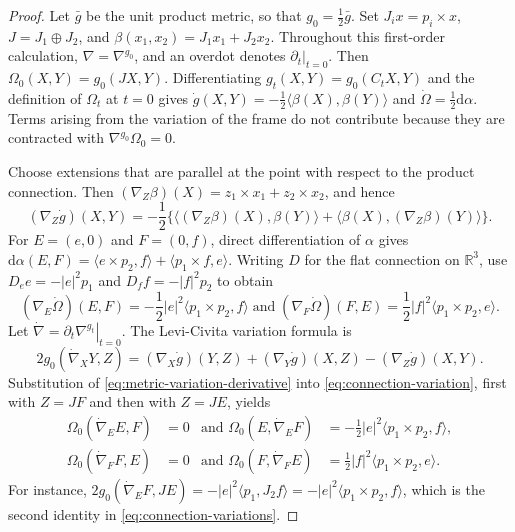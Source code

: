 \documentclass[11pt]{article}
\theoremstyle{definition}
\theoremstyle{remark}
\newcommand{\R}{\mathbb R}
\newcommand{\dd}{\mathrm d}
\begin{document}
\begin{proof}
Let $\bar g$ be the unit product metric, so that
$g_0=\frac12\bar g$.  Set $J_i x=p_i\times x$,
$J=J_1\oplus J_2$, and $\beta(x_1,x_2)=J_1x_1+J_2x_2$.
Throughout this first-order calculation, $\nabla=\nabla^{g_0}$, and an
overdot denotes $\left.\partial_t\right|_{t=0}$.
Then $\Omega_0(X,Y)=g_0(JX,Y)$.  Differentiating
$g_t(X,Y)=g_0(C_tX,Y)$ and the definition of $\Omega_t$ at $t=0$ gives
$\dot g(X,Y)=-\tfrac12\langle\beta(X),\beta(Y)\rangle$ and
$\dot\Omega=\tfrac12\dd\alpha$.
Terms arising from the variation of the frame do not contribute because they
are contracted with $\nabla^{g_0}\Omega_0=0$.

Choose extensions that are parallel at the point with respect to the product
connection.  Then
$(\nabla_Z\beta)(X)=z_1\times x_1+z_2\times x_2$, and hence
\begin{equation}\label{eq:metric-variation-derivative}
 (\nabla_Z\dot g)(X,Y)=-\frac12\{\langle(\nabla_Z\beta)(X),\beta(Y)\rangle+\langle\beta(X),(\nabla_Z\beta)(Y)\rangle\}.
\end{equation}
For $E=(e,0)$ and $F=(0,f)$, direct differentiation of $\alpha$ gives
$\dd\alpha(E,F)
=\langle e\times p_2,f\rangle+\langle p_1\times f,e\rangle$.
Writing $D$ for the flat connection on $\R^3$, use
$D_e e=-|e|^2p_1$ and $D_f f=-|f|^2p_2$ to obtain
\begin{equation}                                                                    \label{eq:omega-variations}
 (\nabla_E\dot\Omega)(E,F)=-\frac12|e|^2\langle p_1\times p_2,f\rangle
 \;\text{and}\; (\nabla_F\dot\Omega)(F,E)=\frac12|f|^2\langle p_1\times p_2,e\rangle.
\end{equation}
Let $\dot{\nabla}=\left.\partial_t\nabla^{g_t}\right|_{t=0}$.  The
Levi-Civita variation
formula is
\begin{equation}                                                                    \label{eq:connection-variation}
 2g_0(\dot{\nabla}_X Y,Z)
 =(\nabla_X\dot g)(Y,Z)+(\nabla_Y\dot g)(X,Z)
 -(\nabla_Z\dot g)(X,Y).
\end{equation}
Substitution of \eqref{eq:metric-variation-derivative} into
\eqref{eq:connection-variation}, first with $Z=JF$ and then with
$Z=JE$, yields
\begin{equation}                                                                    \label{eq:connection-variations}
 \begin{aligned}
 \Omega_0(\dot{\nabla}_E E,F)&=0
 &\text{and } \Omega_0(E,\dot{\nabla}_E F)&=-\frac12|e|^2\langle p_1\times p_2,f\rangle,\\
 \Omega_0(\dot{\nabla}_F F,E)&=0
 &\text{and } \Omega_0(F,\dot{\nabla}_F E)&=\frac12|f|^2\langle p_1\times p_2,e\rangle.
 \end{aligned}
\end{equation}
For instance,
$2g_0(\dot{\nabla}_E F,J E)=-|e|^2\langle p_1,J_2f\rangle
=-|e|^2\langle p_1\times p_2,f\rangle$, which is the second identity in
\eqref{eq:connection-variations}.


\end{proof}
\end{document}
